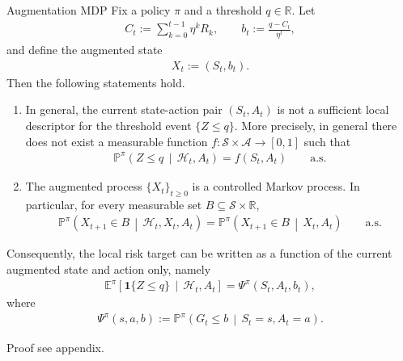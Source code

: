 \begin{theorem}{Augmentation MDP}
Fix a policy $\pi$ and a threshold $q\in\mathbb{R}$. Let
\begin{align}
    C_t := \sum_{k=0}^{t-1}\eta^k R_k,
    \qquad
    b_t := \frac{q-C_t}{\eta^t},
\end{align}
and define the augmented state
\begin{align}
    X_t := (S_t,b_t).
\end{align}
Then the following statements hold.

\begin{enumerate}
    \item[(i)] In general, the current state-action pair $(S_t,A_t)$ is not a sufficient local descriptor for the threshold event $\{Z\le q\}$. More precisely, in general there does not exist a measurable function $f:\mathcal{S}\times\mathcal{A}\to [0,1]$ such that
    \begin{align}
        \mathbb{P}^{\pi}\!\left(
            Z\le q
            \,\middle|\,
            \mathcal{H}_t,A_t
        \right)
        =
        f(S_t,A_t)
        \qquad \text{a.s.}
    \end{align}

    \item[(ii)] The augmented process $\{X_t\}_{t\ge 0}$ is a controlled Markov process. In particular, for every measurable set $B\subseteq \mathcal{S}\times\mathbb{R}$,
    \begin{align}
        \mathbb{P}^{\pi}\!\left(
            X_{t+1}\in B
            \,\middle|\,
            \mathcal{H}_t,X_t,A_t
        \right)
        =
        \mathbb{P}^{\pi}\!\left(
            X_{t+1}\in B
            \,\middle|\,
            X_t,A_t
        \right)
        \qquad \text{a.s.}
    \end{align}
\end{enumerate}
Consequently, the local risk target can be written as a function of the current augmented state and action only, namely
\begin{align}
    \mathbb{E}^{\pi}\!\left[
        \mathbf{1}\{Z\le q\}
        \,\middle|\,
        \mathcal{H}_t,A_t
    \right]
    =
    \Psi^{\pi}(S_t,A_t,b_t),
\end{align}
where
\begin{align}
    \Psi^{\pi}(s,a,b)
    :=
    \mathbb{P}^{\pi}\!\left(
        G_t\le b
        \,\middle|\,
        S_t=s,A_t=a
    \right).
\end{align}
\end{theorem}
Proof see appendix.

